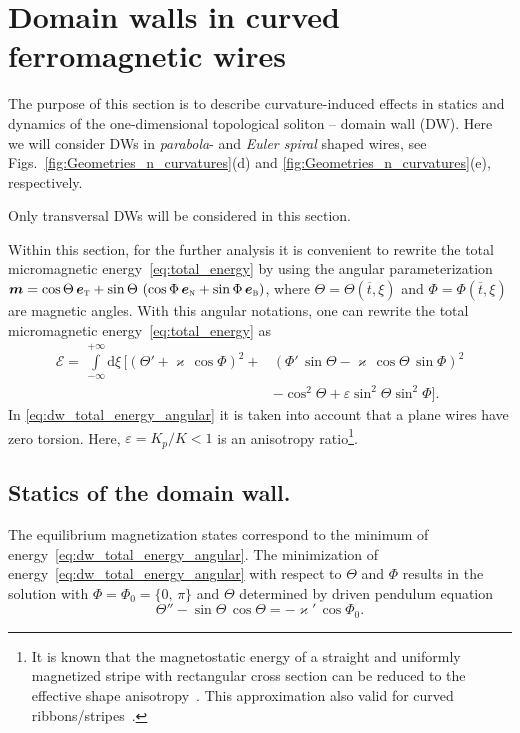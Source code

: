 \section{Domain walls in curved ferromagnetic wires}\label{sec:domain_walls}

The purpose of this section is to describe curvature-induced effects in statics and dynamics of the one-dimensional topological soliton -- domain wall (DW). Here we will consider DWs in \textit{parabola}- and \textit{Euler spiral} shaped wires, see Figs.~\ref{fig:Geometries_n_curvatures}(d) and \ref{fig:Geometries_n_curvatures}(e), respectively.

Only transversal DWs will be considered in this section.

Within this section, for the further analysis it is convenient to rewrite the total micromagnetic energy~\eqref{eq:total_energy} by using the angular parameterization $\vec{m} = \cos\Theta \, \vec{e}_{\textsc{t}}+\sin\Theta \,\left(\cos\Phi \, \vec{e}_{\textsc{n}} + \sin \Phi \, \vec{e}_{\textsc{b}}\right)$, where $\Theta=\Theta(\overline{t},\xi)$ and $\Phi=\Phi(\overline{t},\xi)$ are magnetic angles. With this angular notations, one can rewrite the total micromagnetic energy~\eqref{eq:total_energy}  as
\begin{equation}\label{eq:dw_total_energy_angular}
\begin{split}
\mathcal{E} =  \, \int\limits^{+ \infty}_{-\infty}\mathrm{d}\xi \, \bigl[(\Theta' + \varkappa \, \cos \Phi)^2 +& (\Phi' \, \sin \Theta  - \varkappa \, \cos \Theta \, \sin \Phi)^2\\
&- \cos^2 \Theta + \varepsilon \sin^2\Theta\sin^2\Phi\bigr].
\end{split}
\end{equation}
In \eqref{eq:dw_total_energy_angular} it is taken into account that a plane wires have zero torsion. Here, $\varepsilon = K_p / K<1$ is an anisotropy ratio\footnote{It is known that the magnetostatic energy of a straight and uniformly magnetized stripe with rectangular cross section can be reduced to the effective shape anisotropy~\cite{Aharoni98}. This approximation also valid for curved ribbons/stripes~\cite{Gaididei19}.}.

\subsection{Statics of the domain wall.}

The equilibrium magnetization states correspond to the minimum of energy~\eqref{eq:dw_total_energy_angular}. The minimization of energy~\eqref{eq:dw_total_energy_angular} with respect to $\Theta$ and $\Phi$ results in the solution  with $\Phi = \Phi_0 =\{ 0, \, \pi\}$ and $\Theta$ determined by driven pendulum equation
\begin{equation} \label{eq:dw_theta_equation}
\Theta'' - \sin \Theta \, \cos \Theta = - \varkappa' \, \cos \Phi_0.
\end{equation}

